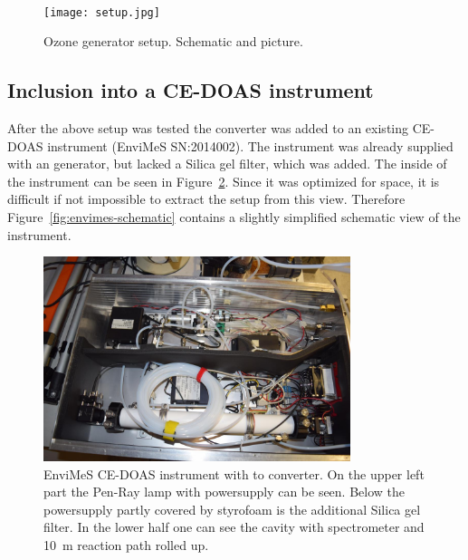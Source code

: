\begin{figure}[htbp]
  \centering
  {
  \def\svgwidth{0.9\linewidth}
  
  }
  \phantom{h}\\
  \bigskip
  \texttt{[image: setup.jpg]}
  \caption{Ozone generator setup. Schematic and picture.}
  \label{fig:setup}
\end{figure}

\subsection{Inclusion into a CE-DOAS instrument}
\label{sec:inclusion}

After the above setup was tested the converter was added to an
existing CE-DOAS instrument (EnviMeS SN:2014002). The instrument was already supplied with an 
generator, but lacked a Silica gel filter, which was added. The inside
of the instrument can be seen in Figure~\ref{fig:envimes}. Since it
was optimized for space, it is difficult if not impossible to extract
the setup from this view. Therefore Figure~\ref{fig:envimes-schematic}
contains a slightly simplified schematic view of the instrument. 

\begin{figure}[htbp]
  \centering
  \includegraphics[width=0.8\textwidth]{images/envimes_up.jpg}
  \caption{EnviMeS CE-DOAS instrument with  to 
    converter. On the upper left part the Pen-Ray lamp with
    powersupply can be seen. Below the powersupply partly covered by
    styrofoam is the additional Silica gel filter. In the lower half
    one can see the cavity with spectrometer and \SI{10}{\meter}
    reaction path rolled up.}
  \label{fig:envimes}
\end{figure}

